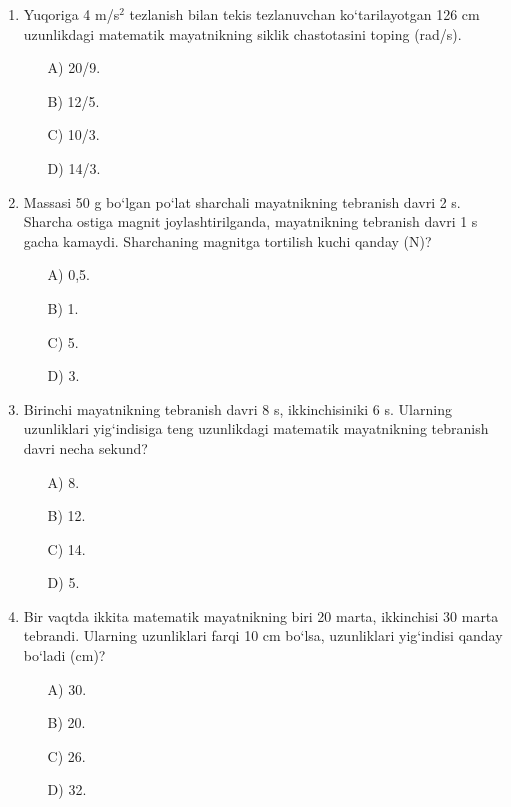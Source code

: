 \begin{enumerate}
\begin{itemize}
    \end{itemize}

    \item Yuqoriga 4 m/s$^2$ tezlanish bilan tekis tezlanuvchan ko‘tarilayotgan 126 cm uzunlikdagi matematik mayatnikning siklik chastotasini toping (rad/s).
    \begin{itemize}
        \item[A)] 20/9.
        \item[B)] 12/5.
        \item[C)] 10/3.
        \item[D)] 14/3.
        
    \end{itemize}

    \item Massasi 50 g bo‘lgan po‘lat sharchali mayatnikning tebranish davri 2 s. Sharcha ostiga magnit joylashtirilganda, mayatnikning tebranish davri 1 s gacha kamaydi. Sharchaning magnitga tortilish kuchi qanday (N)?
    \begin{itemize}
        \item[A)] 0,5.
        \item[B)] 1.
        \item[C)] 5.
        \item[D)] 3.
        
    \end{itemize}

    \item Birinchi mayatnikning tebranish davri 8 s, ikkinchisiniki 6 s. Ularning uzunliklari yig‘indisiga teng uzunlikdagi matematik mayatnikning tebranish davri necha sekund?
    \begin{itemize}
        \item[A)] 8.
        \item[B)] 12.
        \item[C)] 14.
        \item[D)] 5.
        
    \end{itemize}

    \item Bir vaqtda ikkita matematik mayatnikning biri 20 marta, ikkinchisi 30 marta tebrandi. Ularning uzunliklari farqi 10 cm bo‘lsa, uzunliklari yig‘indisi qanday bo‘ladi (cm)?
    \begin{itemize}
        \item[A)] 30.
        \item[B)] 20.
        \item[C)] 26.
        \item[D)] 32.
        

\end{itemize}
\end{enumerate}
